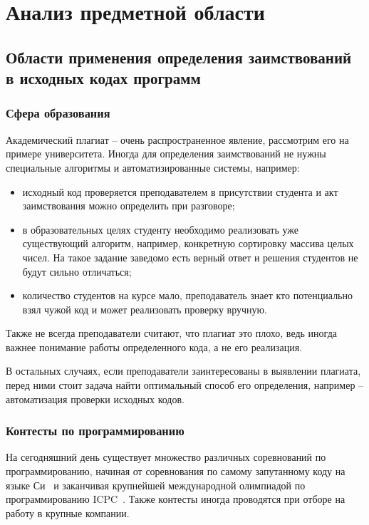 \section{Анализ предметной области}

\subsection{Области применения определения заимствований в исходных кодах программ}
\subsubsection{Сфера образования}

Академический плагиат -- очень распространенное явление, рассмотрим его на примере университета. Иногда для определения заимствований не нужны специальные алгоритмы и автоматизированные системы, например:
\begin{itemize}[label*=---]
	\item исходный код проверяется преподавателем в присутствии студента и акт заимствования можно определить при разговоре;
	\item в образовательных целях студенту необходимо реализовать уже существующий алгоритм, например, конкретную сортировку массива целых  чисел. На такое задание заведомо есть верный ответ и решения студентов не будут сильно отличаться;
	\item количество студентов на курсе мало, преподаватель знает кто потенциально взял чужой код и может реализовать проверку вручную.
\end{itemize}

Также не всегда преподаватели считают, что плагиат это плохо, ведь иногда важнее понимание работы определенного кода, а не его реализация.

В остальных случаях, если преподаватели заинтересованы в выявлении плагиата, перед ними стоит задача найти оптимальный способ его определения, например --  автоматизация проверки исходных кодов.  

\subsubsection{Контесты по программированию}

На сегодняшний день существует множество различных соревнований по программированию, начиная от соревнования по самому запутанному коду на языке Си~\cite{ioccc} и заканчивая крупнейшей международной олимпиадой по программированию ICPC~\cite{icpc}. Также контесты иногда проводятся при отборе на работу в крупные компании.

